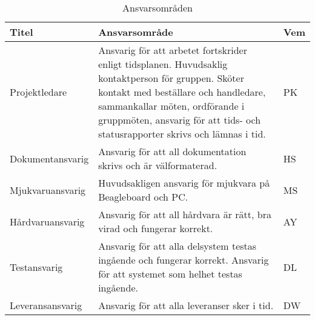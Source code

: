 \begin{table}[h]
  \centering
    \begin{tabularx}{\textwidth}{| l | X | l |}
      \hline
      \textbf{Titel} & \textbf{Ansvarsområde} & \textbf{Vem} \\
      \hline
      {Projektledare} & {Ansvarig för att arbetet fortskrider enligt tidsplanen. Huvudsaklig kontaktperson för gruppen. Sköter kontakt med beställare och handledare, sammankallar möten, ordförande i gruppmöten, ansvarig för att tids- och statusrapporter skrivs och lämnas i tid.} & {PK} \\\hline
      {Dokumentansvarig} & {Ansvarig för att all dokumentation skrivs och är välformaterad.} & {HS} \\\hline
      {Mjukvaruansvarig} & {Huvudsakligen ansvarig för mjukvara på Beagleboard och PC.} & {MS} \\\hline
      {Hårdvaruansvarig} & {Ansvarig för att all hårdvara är rätt, bra virad och fungerar korrekt.} & {AY} \\\hline
      {Testansvarig} & {Ansvarig för att alla delsystem testas ingående och fungerar korrekt. Ansvarig för att systemet som helhet testas ingående.} & {DL} \\\hline
      {Leveransansvarig} & {Ansvarig för att alla leveranser sker i tid.} & {DW} \\\hline
    \end{tabularx}
  \caption{Ansvarsområden} \label{projektplan:ansvarsomraden}
\end{table}